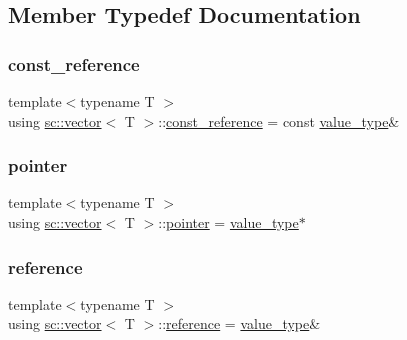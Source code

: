 \subsection{Member Typedef Documentation}
\mbox{\label{classsc_1_1vector_af35df3788a0e228d679e7520b2485896}} 
\subsubsection{\texorpdfstring{const\+\_\+reference}{const\_reference}}
{\footnotesize\ttfamily template$<$typename T $>$ \\
using \hyperlink{classsc_1_1vector}{sc\+::vector}$<$ T $>$\+::\hyperlink{classsc_1_1vector_af35df3788a0e228d679e7520b2485896}{const\+\_\+reference} =  const \hyperlink{classsc_1_1vector_ad37f5bfa688e43c420ed565e4bff6fac}{value\+\_\+type}\&}

\mbox{\label{classsc_1_1vector_a482b9f7edc29ff22ccd2b17a23e37eb4}} 
\subsubsection{\texorpdfstring{pointer}{pointer}}
{\footnotesize\ttfamily template$<$typename T $>$ \\
using \hyperlink{classsc_1_1vector}{sc\+::vector}$<$ T $>$\+::\hyperlink{classsc_1_1vector_a482b9f7edc29ff22ccd2b17a23e37eb4}{pointer} =  \hyperlink{classsc_1_1vector_ad37f5bfa688e43c420ed565e4bff6fac}{value\+\_\+type}$\ast$}

\mbox{\label{classsc_1_1vector_a3a0cf48945f82afc95f92710883016d2}} 
\subsubsection{\texorpdfstring{reference}{reference}}
{\footnotesize\ttfamily template$<$typename T $>$ \\
using \hyperlink{classsc_1_1vector}{sc\+::vector}$<$ T $>$\+::\hyperlink{classsc_1_1vector_a3a0cf48945f82afc95f92710883016d2}{reference} =  \hyperlink{classsc_1_1vector_ad37f5bfa688e43c420ed565e4bff6fac}{value\+\_\+type}\&}


